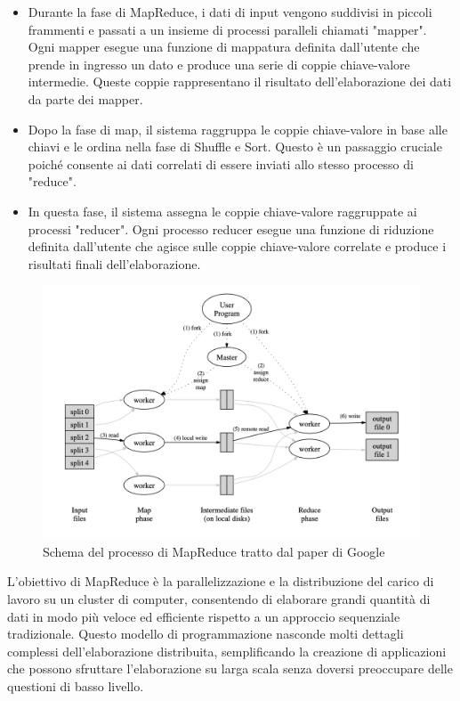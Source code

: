 \begin{itemize}
    \item Durante la fase di MapReduce, i dati di input vengono suddivisi in piccoli frammenti e passati a un insieme di processi paralleli chiamati "mapper". Ogni mapper esegue una funzione di mappatura definita dall'utente che prende in ingresso un dato e produce una serie di coppie chiave-valore intermedie. Queste coppie rappresentano il risultato dell'elaborazione dei dati da parte dei mapper.
    \item Dopo la fase di map, il sistema raggruppa le coppie chiave-valore in base alle chiavi e le ordina nella fase di Shuffle e Sort. Questo è un passaggio cruciale poiché consente ai dati correlati di essere inviati allo stesso processo di "reduce".
    \item In questa fase, il sistema assegna le coppie chiave-valore raggruppate ai processi "reducer". Ogni processo reducer esegue una funzione di riduzione definita dall'utente che agisce sulle coppie chiave-valore correlate e produce i risultati finali dell'elaborazione.
\end{itemize}

\begin{figure}[H]
    \centering
    \includegraphics[scale=.4]{img/mapReduceGoogle.png}
    \caption{Schema del processo di MapReduce tratto dal paper di Google}
    \label{mapReduceGoogle}
\end{figure}
L'obiettivo di MapReduce è la parallelizzazione e la distribuzione del carico di lavoro su un cluster di computer, consentendo di elaborare grandi quantità di dati in modo più veloce ed efficiente rispetto a un approccio sequenziale tradizionale. Questo modello di programmazione nasconde molti dettagli complessi dell'elaborazione distribuita, semplificando la creazione di applicazioni che possono sfruttare l'elaborazione su larga scala senza doversi preoccupare delle questioni di basso livello.

